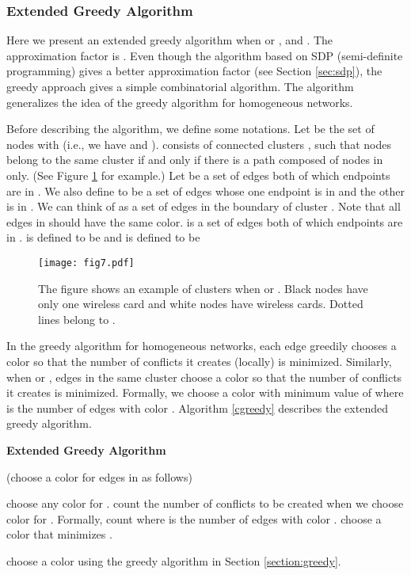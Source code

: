 \documentclass[titlepage, 11pt]{article}
\begin{document}
\subsubsection{Extended Greedy Algorithm}
\label{sec:ext}


Here we present an extended greedy algorithm when  or ,
and .
The approximation factor is . Even though
the algorithm based on SDP (semi-definite programming) gives
a better approximation factor (see Section \ref{sec:sdp}), 
the greedy approach gives a simple combinatorial algorithm. 
The algorithm generalizes the idea of the greedy algorithm 
for homogeneous networks.

Before describing the algorithm, we define some notations. 
Let  be the set of nodes  with 
(i.e., we have  and ).
 consists of connected clusters ,
such that nodes  belong to the same cluster
if and only if there is a path composed of nodes in  only.
(See Figure \ref{fig:cgreedy} for example.)
Let   be a set of edges both of which endpoints are in .
We also define  to be a set of edges whose one
endpoint is in  and the other is in . We can think of 
 as a set of edges in the boundary of cluster .
Note that all edges in  should have the same color.
  is a set of edges both of which endpoints are in .
 is defined to be  and  is defined to be 

\begin{figure}[ht]      
\begin{center}        
  \begin{center}
    \centerline{\texttt{[image: fig7.pdf]}}
    \caption{The figure shows an example of clusters 
when  or . Black nodes have only one wireless card
and white nodes have  wireless cards. Dotted lines belong
to .
\label{fig:cgreedy}}
  \end{center}
\end{center}
\end{figure}

In the greedy algorithm for homogeneous networks,
each edge greedily chooses a color so that
the number of conflicts it creates (locally) is minimized.
Similarly, when  or , edges in the same cluster 
choose a color  so that the number of conflicts it creates is minimized.
Formally, we choose a color  with minimum value of 
 where
 is the number of edges  with color . Algorithm \ref{cgreedy} describes the extended greedy algorithm.

\begin{algorithm}[ht]
\caption{\bf  Extended Greedy Algorithm}
\label{cgreedy}
\begin{algorithmic}
	\STATE (choose a color for edges in  as follows)

	\STATE choose any color for .
\ELSE 
	\STATE count the number of conflicts to be created 
when we choose color  for .
Formally, count  where
 is the number of edges  
with color .
\ENDFOR
\STATE choose a color  
that  minimizes . 
\ENDIF
\ENDFOR

\STATE choose a color using the greedy algorithm
in Section \ref{section:greedy}.
\ENDFOR
\end{algorithmic}
\end{algorithm}
\end{document}
